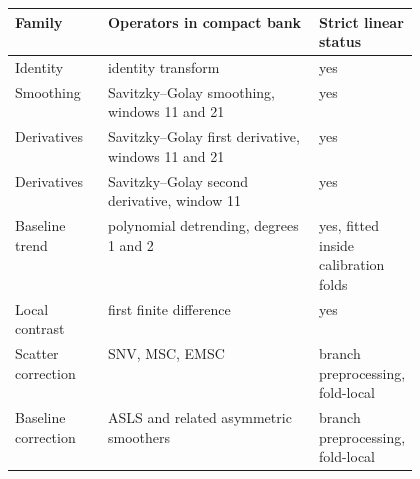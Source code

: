 \begin{tabularx}{\linewidth}{p{0.23\linewidth}X p{0.24\linewidth}}
\toprule
Family & Operators in compact bank & Strict linear status \\
\midrule
Identity & identity transform & yes \\
Smoothing & Savitzky--Golay smoothing, windows 11 and 21 & yes \\
Derivatives & Savitzky--Golay first derivative, windows 11 and 21 & yes \\
Derivatives & Savitzky--Golay second derivative, window 11 & yes \\
Baseline trend & polynomial detrending, degrees 1 and 2 & yes, fitted inside calibration folds \\
Local contrast & first finite difference & yes \\
\midrule
Scatter correction & SNV, MSC, EMSC & branch preprocessing, fold-local \\
Baseline correction & ASLS and related asymmetric smoothers & branch preprocessing, fold-local \\
\bottomrule
\end{tabularx}
